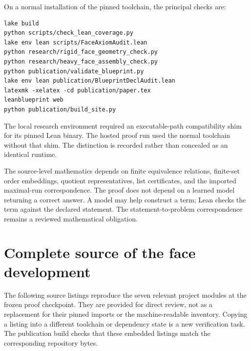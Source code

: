 \documentclass[11pt,reqno]{amsart}
\theoremstyle{definition}
\begin{document}
On a normal installation of the pinned toolchain, the principal checks are:
\begin{Verbatim}[fontsize=\small,breaklines=true]
lake build
python scripts/check_lean_coverage.py
lake env lean scripts/FaceAxiomAudit.lean
python research/rigid_face_geometry_check.py
python research/heavy_face_assembly_check.py
python publication/validate_blueprint.py
lake env lean publication/BlueprintDeclAudit.lean
latexmk -xelatex -cd publication/paper.tex
leanblueprint web
python publication/build_site.py
\end{Verbatim}
The local research environment required an executable-path compatibility
shim for its pinned Lean binary. The hosted proof run used the normal
toolchain without that shim. The distinction is recorded rather than
concealed as an identical runtime.

The source-level mathematics depends on finite equivalence relations,
finite-set order embeddings, quotient representatives, list certificates,
and the imported maximal-run correspondence. The proof does not depend on a
learned model returning a correct answer. A model may help construct a term;
Lean checks the term against the declared statement. The statement-to-problem
correspondence remains a reviewed mathematical obligation.

\section{Complete source of the face development}\label{app:sources}
The following source listings reproduce the seven relevant project modules
at the frozen proof checkpoint. They are provided for direct review, not as
a replacement for their pinned imports or the machine-readable inventory.
Copying a listing into a different toolchain or dependency state is a new
verification task. The publication build checks that these embedded listings
match the corresponding repository bytes.
\end{document}
